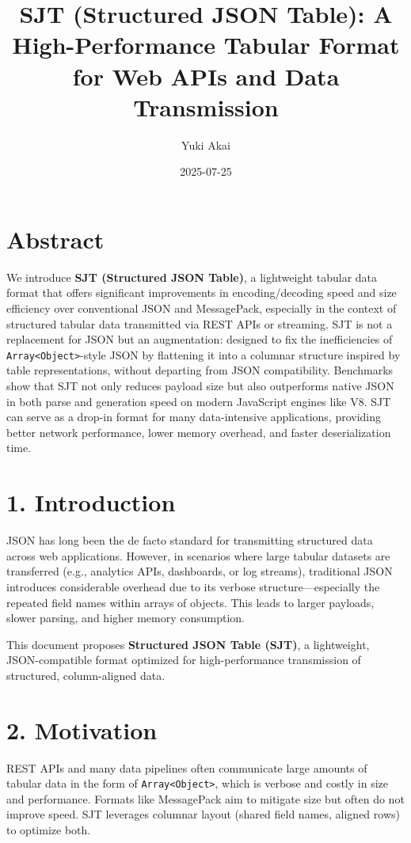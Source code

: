 \documentclass[12pt]{article}
\title{SJT (Structured JSON Table): A High-Performance Tabular Format for Web APIs and Data Transmission}
\author{Yuki Akai}
\date{2025-07-25}
\begin{document}
\maketitle

\section*{Abstract}

We introduce \textbf{SJT (Structured JSON Table)}, a lightweight tabular data format that offers significant improvements in encoding/decoding speed and size efficiency over conventional JSON and MessagePack, especially in the context of structured tabular data transmitted via REST APIs or streaming. SJT is not a replacement for JSON but an augmentation: designed to fix the inefficiencies of \texttt{Array<Object>}-style JSON by flattening it into a columnar structure inspired by table representations, without departing from JSON compatibility. Benchmarks show that SJT not only reduces payload size but also outperforms native JSON in both parse and generation speed on modern JavaScript engines like V8. SJT can serve as a drop-in format for many data-intensive applications, providing better network performance, lower memory overhead, and faster deserialization time.

\section*{1. Introduction}

JSON has long been the de facto standard for transmitting structured data across web applications. However, in scenarios where large tabular datasets are transferred (e.g., analytics APIs, dashboards, or log streams), traditional JSON introduces considerable overhead due to its verbose structure---especially the repeated field names within arrays of objects. This leads to larger payloads, slower parsing, and higher memory consumption.

This document proposes \textbf{Structured JSON Table (SJT)}, a lightweight, JSON-compatible format optimized for high-performance transmission of structured, column-aligned data.

\section*{2. Motivation}

REST APIs and many data pipelines often communicate large amounts of tabular data in the form of \texttt{Array<Object>}, which is verbose and costly in size and performance. Formats like MessagePack aim to mitigate size but often do not improve speed. SJT leverages columnar layout (shared field names, aligned rows) to optimize both.
\end{document}
